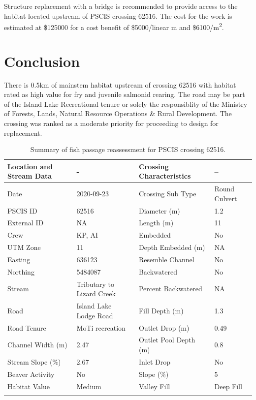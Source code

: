 \documentclass[
]{book}
\begin{document}
Structure replacement with a bridge is recommended to provide access to the habitat located upstream of PSCIS crossing 62516. The cost for the work is estimated at \$125000 for a cost benefit of \$5000/linear m and \$6100/m\textsuperscript{2}.

\hypertarget{conclusion-6}{%
\section*{Conclusion}\label{conclusion-6}}

There is 0.5km of mainstem habitat upstream of crossing 62516 with habitat rated as high value for fry and juvenile salmonid rearing. The road may be part of the Island Lake Recreational tenure or solely the responsiblity of the Ministry of Forests, Lands, Natural Resource Operations \& Rural Development. The crossing was ranked as a moderate priority for proceeding to design for replacement.

\begin{table}

\caption{\label{tab:tab-culvert-040}Summary of fish passage reassessment for PSCIS crossing 62516.}
\centering
\fontsize{11}{13}\selectfont
\begin{tabu} to 
\hline
Location and Stream Data & - & Crossing Characteristics & --\\
\hline
Date & 2020-09-23 & Crossing Sub Type & Round Culvert\\
\hline
PSCIS ID & 62516 & Diameter (m) & 1.2\\
\hline
External ID & NA & Length (m) & 11\\
\hline
Crew & KP, AI & Embedded & No\\
\hline
UTM Zone & 11 & Depth Embedded (m) & NA\\
\hline
Easting & 636123 & Resemble Channel & No\\
\hline
Northing & 5484087 & Backwatered & No\\
\hline
Stream & Tributary to Lizard Creek & Percent Backwatered & NA\\
\hline
Road & Island Lake Lodge Road & Fill Depth (m) & 1.3\\
\hline
Road Tenure & MoTi recreation & Outlet Drop (m) & 0.49\\
\hline
Channel Width (m) & 2.47 & Outlet Pool Depth (m) & 0.8\\
\hline
Stream Slope (\%) & 2.67 & Inlet Drop & No\\
\hline
Beaver Activity & No & Slope (\%) & 5\\
\hline
Habitat Value & Medium & Valley Fill & Deep Fill\\
\hline
{}\\
\end{tabu}
\end{table}
\end{document}
